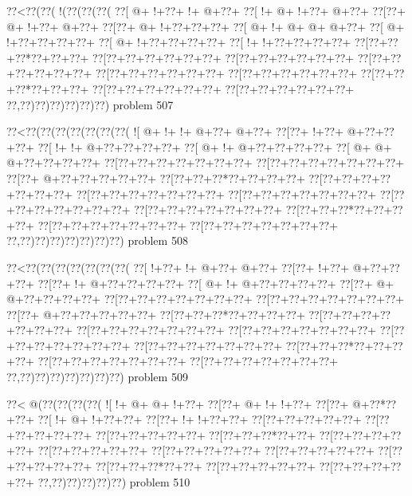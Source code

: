 \vbox{\vbox{\goo
\0??<\0??(\0??(\- !(\0??(\0??(\0??(
\0??[\- @+\- !+\0??+\- !+\- @+\0??+
\0??[\- !+\- @+\- !+\0??+\- @+\0??+
\0??[\0??+\- @+\- !+\0??+\- @+\0??+
\0??[\0??+\- @+\- !+\0??+\0??+\0??+
\0??[\- @+\- !+\- @+\- @+\- @+\0??+
\0??[\- @+\- !+\0??+\0??+\0??+\0??+
\0??[\- @+\- !+\0??+\0??+\0??+\0??+
\0??[\- !+\- !+\0??+\0??+\0??+\0??+
\0??[\0??+\0??+\0??*\0??+\0??+\0??+
\0??[\0??+\0??+\0??+\0??+\0??+\0??+
\0??[\0??+\0??+\0??+\0??+\0??+\0??+
\0??[\0??+\0??+\0??+\0??+\0??+\0??+
\0??[\0??+\0??+\0??+\0??+\0??+\0??+
\0??[\0??+\0??+\0??+\0??+\0??+\0??+
\0??[\0??+\0??+\0??*\0??+\0??+\0??+
\0??[\0??+\0??+\0??+\0??+\0??+\0??+
\0??[\0??+\0??+\0??+\0??+\0??+\0??+
\0??,\0??)\0??)\0??)\0??)\0??)\0??)
}
\hfil problem 507\hfil\break
}

\vbox{\vbox{\goo
\0??<\0??(\0??(\0??(\0??(\0??(\0??(\0??(
\- ![\- @+\- !+\- !+\- @+\0??+\- @+\0??+
\0??[\0??+\- !+\0??+\- @+\0??+\0??+\0??+
\0??[\- !+\- !+\- @+\0??+\0??+\0??+\0??+
\0??[\- @+\- !+\- @+\0??+\0??+\0??+\0??+
\0??[\- @+\- @+\- @+\0??+\0??+\0??+\0??+
\0??[\0??+\0??+\0??+\0??+\0??+\0??+\0??+
\0??[\0??+\0??+\0??+\0??+\0??+\0??+\0??+
\0??[\0??+\- @+\0??+\0??+\0??+\0??+\0??+
\0??[\0??+\0??+\0??*\0??+\0??+\0??+\0??+
\0??[\0??+\0??+\0??+\0??+\0??+\0??+\0??+
\0??[\0??+\0??+\0??+\0??+\0??+\0??+\0??+
\0??[\0??+\0??+\0??+\0??+\0??+\0??+\0??+
\0??[\0??+\0??+\0??+\0??+\0??+\0??+\0??+
\0??[\0??+\0??+\0??+\0??+\0??+\0??+\0??+
\0??[\0??+\0??+\0??*\0??+\0??+\0??+\0??+
\0??[\0??+\0??+\0??+\0??+\0??+\0??+\0??+
\0??[\0??+\0??+\0??+\0??+\0??+\0??+\0??+
\0??,\0??)\0??)\0??)\0??)\0??)\0??)\0??)
}
\hfil problem 508\hfil\break
}

\vbox{\vbox{\goo
\0??<\0??(\0??(\0??(\0??(\0??(\0??(\0??(
\0??[\- !+\0??+\- !+\- @+\0??+\- @+\0??+
\0??[\0??+\- !+\0??+\- @+\0??+\0??+\0??+
\0??[\0??+\- !+\- @+\0??+\0??+\0??+\0??+
\0??[\- @+\- !+\- @+\0??+\0??+\0??+\0??+
\0??[\0??+\- @+\- @+\0??+\0??+\0??+\0??+
\0??[\0??+\0??+\0??+\0??+\0??+\0??+\0??+
\0??[\0??+\0??+\0??+\0??+\0??+\0??+\0??+
\0??[\0??+\- @+\0??+\0??+\0??+\0??+\0??+
\0??[\0??+\0??+\0??*\0??+\0??+\0??+\0??+
\0??[\0??+\0??+\0??+\0??+\0??+\0??+\0??+
\0??[\0??+\0??+\0??+\0??+\0??+\0??+\0??+
\0??[\0??+\0??+\0??+\0??+\0??+\0??+\0??+
\0??[\0??+\0??+\0??+\0??+\0??+\0??+\0??+
\0??[\0??+\0??+\0??+\0??+\0??+\0??+\0??+
\0??[\0??+\0??+\0??*\0??+\0??+\0??+\0??+
\0??[\0??+\0??+\0??+\0??+\0??+\0??+\0??+
\0??[\0??+\0??+\0??+\0??+\0??+\0??+\0??+
\0??,\0??)\0??)\0??)\0??)\0??)\0??)\0??)
}
\hfil problem 509\hfil\break
}

\vbox{\vbox{\goo
\0??<\- @(\0??(\0??(\0??(\0??(
\- ![\- !+\- @+\- @+\- !+\0??+
\0??[\0??+\- @+\- !+\- !+\0??+
\0??[\0??+\- @+\0??*\0??+\0??+
\0??[\- !+\- @+\- !+\0??+\0??+
\0??[\0??+\- !+\- !+\0??+\0??+
\0??[\0??+\0??+\0??+\0??+\0??+
\0??[\0??+\0??+\0??+\0??+\0??+
\0??[\0??+\0??+\0??+\0??+\0??+
\0??[\0??+\0??+\0??*\0??+\0??+
\0??[\0??+\0??+\0??+\0??+\0??+
\0??[\0??+\0??+\0??+\0??+\0??+
\0??[\0??+\0??+\0??+\0??+\0??+
\0??[\0??+\0??+\0??+\0??+\0??+
\0??[\0??+\0??+\0??+\0??+\0??+
\0??[\0??+\0??+\0??*\0??+\0??+
\0??[\0??+\0??+\0??+\0??+\0??+
\0??[\0??+\0??+\0??+\0??+\0??+
\0??,\0??)\0??)\0??)\0??)\0??)
}
\hfil problem 510\hfil\break
}

